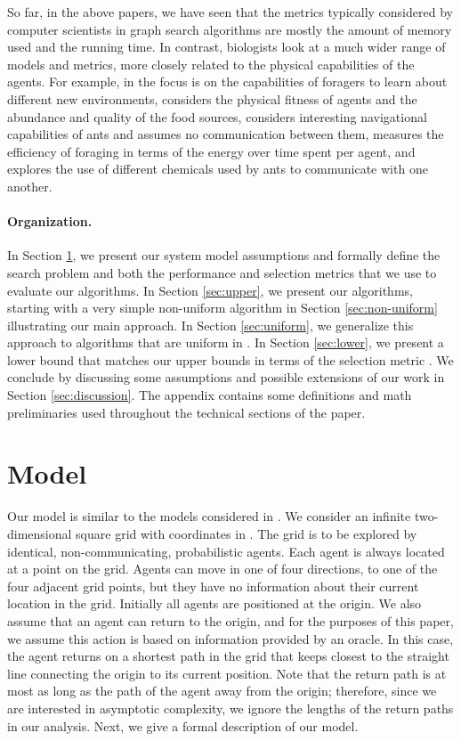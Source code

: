 \documentclass[11pt]{article}
\begin{document}
 So far, in the above papers, we have seen that the metrics typically considered by computer scientists in graph search algorithms are mostly the amount of memory used and the running time. In contrast, biologists look at a much wider range of models and metrics, more closely related to the physical capabilities of the agents. For example, in \cite{arbilly10} the focus is on the capabilities of foragers to learn about different new environments, \cite{giraldeau00} considers the physical fitness of agents and the abundance and quality of the food sources, \cite{harkness85} considers interesting navigational capabilities of ants and assumes no communication between them, \cite{holder87} measures the efficiency of foraging in terms of the energy over time spent per agent, and \cite{robinson05} explores the use of different chemicals used by ants to communicate with one another.

\paragraph{Organization.}

In Section \ref{sec:model}, we present our system model assumptions and formally define the search problem and both the performance and selection metrics that we use to evaluate our algorithms. In Section \ref{sec:upper}, we present our algorithms, starting with a very simple non-uniform algorithm in Section \ref{sec:non-uniform} illustrating our main approach. In Section \ref{sec:uniform}, we generalize this approach to algorithms that are uniform in . In Section \ref{sec:lower}, we present a lower bound that matches our upper bounds in terms of the selection metric . We conclude by discussing some assumptions and possible extensions of our work in Section \ref{sec:discussion}. The appendix contains some definitions and math preliminaries used throughout the technical sections of the paper.

\section{Model}
\label{sec:model}

Our model is similar to the models considered in \cite{feinerman12disc, feinerman12podc}. We consider an infinite two-dimensional square grid with coordinates in . The grid is to be explored by  identical, non-communicating, probabilistic agents. Each agent is always located at a point on the grid. Agents can move in one of four directions, to one of the four adjacent grid points, but they have no information about their current location in the grid. Initially all agents are positioned at the origin. We also assume that an agent can return to the origin, and for the purposes of this paper, we assume this action is based on information provided by an oracle. In this case, the agent returns on a shortest path in the grid that keeps closest to the straight line connecting the origin to its current position. Note that the return path is at most as long as the path of the agent away from the origin; therefore, since we are interested in asymptotic complexity, we ignore the lengths of the return paths in our analysis. Next, we give a formal description of our model.
\end{document}
